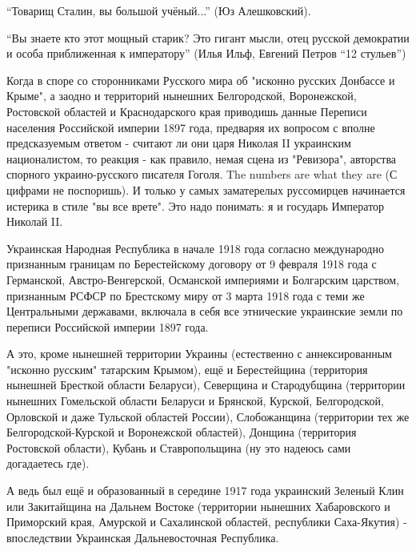\begin{itemize}
 

\enquote{Товарищ Сталин, вы большой учёный...} (Юз Алешковский).

\enquote{Вы знаете кто этот мощный старик? Это гигант мысли, отец русской
демократии и особа приближенная к императору} (Илья Ильф, Евгений Петров
\enquote{12 стульев})

Когда в споре со сторонниками Русского мира об "исконно русских Донбассе и
Крыме", а заодно и территорий нынешних Белгородской, Воронежской, Ростовской
областей и Краснодарского края приводишь данные Переписи населения Российской
империи 1897 года, предваряя их вопросом с вполне предсказуемым ответом -
считают ли они царя Николая II украинским националистом, то реакция - как
правило, немая сцена из "Ревизора", авторства спорного украино-русского
писателя Гоголя. The numbers are what they are (С цифрами не поспоришь). И
только у самых заматерелых руссомирцев начинается истерика в стиле "вы все
врете". Это надо понимать: я и государь Император Николай II.

Украинская Народная Республика в начале 1918 года согласно международно
признанным границам по Берестейскому договору от 9 февраля 1918 года с
Германской, Австро-Венгерской, Османской империями и Болгарским царством,
признанным РСФСР по Брестскому миру от 3 марта 1918 года с теми же Центральными
державами, включала в себя все этнические украинские земли по переписи
Российской империи 1897 года.

А это, кроме нынешней территории Украины (естественно с аннексированным
"исконно русским" татарским Крымом), ещё и Берестейщина (территория нынешней
Бресткой области Беларуси), Северщина и Стародубщина (территории нынешних
Гомельской области Беларуси и Брянской, Курской, Белгородской, Орловской и даже
Тульской областей России), Слобожанщина (территории тех же Белгородской-Курской
и Воронежской областей), Донщина (территория Ростовской области), Кубань и
Ставропольщина (ну это надеюсь сами догадаетесь где).

А ведь был ещё и образованный в середине 1917 года украинский Зеленый Клин или
Закитайщина на Дальнем Востоке (территории нынешних Хабаровского и Приморский
края, Амурской и Сахалинской областей, республики Саха-Якутия) - впоследствии
Украинская Дальневосточная Республика.


\end{itemize}

